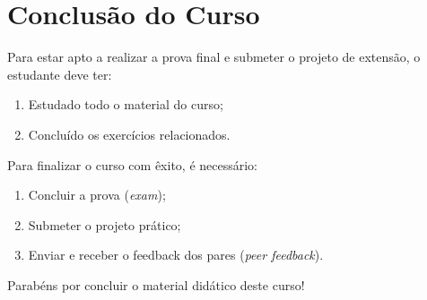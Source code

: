 \documentclass[11pt,a4paper]{article}
\begin{document}
\section{Conclusão do Curso}

Para estar apto a realizar a prova final e submeter o projeto de extensão, o estudante deve ter:
\begin{enumerate}
    \item Estudado todo o material do curso;
    \item Concluído os exercícios relacionados.
\end{enumerate}

Para finalizar o curso com êxito, é necessário:
\begin{enumerate}
    \item Concluir a prova (\emph{exam});
    \item Submeter o projeto prático;
    \item Enviar e receber o feedback dos pares (\emph{peer feedback}).
\end{enumerate}

Parabéns por concluir o material didático deste curso!
\end{document}
